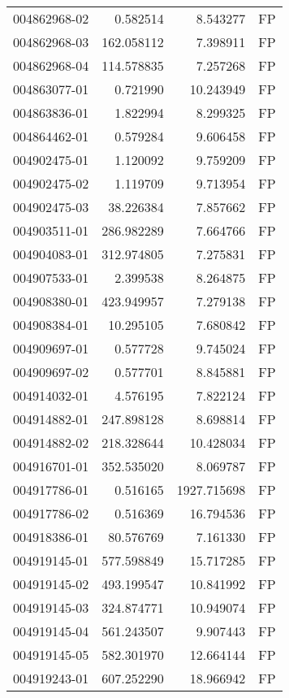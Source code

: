 \begin{tabular}{lrrl}
004862968-02 &    0.582514 &     8.543277 &   FP \\
004862968-03 &  162.058112 &     7.398911 &   FP \\
004862968-04 &  114.578835 &     7.257268 &   FP \\
004863077-01 &    0.721990 &    10.243949 &   FP \\
004863836-01 &    1.822994 &     8.299325 &   FP \\
004864462-01 &    0.579284 &     9.606458 &   FP \\
004902475-01 &    1.120092 &     9.759209 &   FP \\
004902475-02 &    1.119709 &     9.713954 &   FP \\
004902475-03 &   38.226384 &     7.857662 &   FP \\
004903511-01 &  286.982289 &     7.664766 &   FP \\
004904083-01 &  312.974805 &     7.275831 &   FP \\
004907533-01 &    2.399538 &     8.264875 &   FP \\
004908380-01 &  423.949957 &     7.279138 &   FP \\
004908384-01 &   10.295105 &     7.680842 &   FP \\
004909697-01 &    0.577728 &     9.745024 &   FP \\
004909697-02 &    0.577701 &     8.845881 &   FP \\
004914032-01 &    4.576195 &     7.822124 &   FP \\
004914882-01 &  247.898128 &     8.698814 &   FP \\
004914882-02 &  218.328644 &    10.428034 &   FP \\
004916701-01 &  352.535020 &     8.069787 &   FP \\
004917786-01 &    0.516165 &  1927.715698 &   FP \\
004917786-02 &    0.516369 &    16.794536 &   FP \\
004918386-01 &   80.576769 &     7.161330 &   FP \\
004919145-01 &  577.598849 &    15.717285 &   FP \\
004919145-02 &  493.199547 &    10.841992 &   FP \\
004919145-03 &  324.874771 &    10.949074 &   FP \\
004919145-04 &  561.243507 &     9.907443 &   FP \\
004919145-05 &  582.301970 &    12.664144 &   FP \\
004919243-01 &  607.252290 &    18.966942 &   FP \\

\end{tabular}
